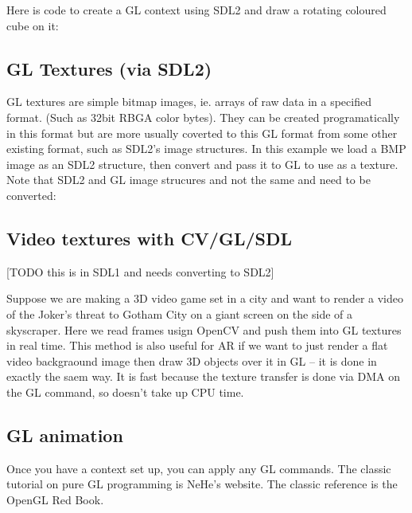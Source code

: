 \documentclass[oneside,english]{scrbook}
\begin{document}



Here is code to create a GL context using SDL2 and draw a rotating coloured cube on it:




\subsection{GL Textures (via SDL2)}

GL textures are simple bitmap images, ie. arrays of raw data in a specified format. (Such as 32bit RBGA color bytes).  They can be created programatically in this format but are more usually coverted to this GL format from some other existing format, such as SDL2's image structures.   In this example we load a BMP image as an SDL2 structure, then convert and pass it to GL to use as a texture. Note that SDL2 and GL image strucures and not the same and need to be converted:




\subsection{Video textures with CV/GL/SDL}

[TODO this is in SDL1 and needs converting to SDL2]

Suppose we are making a 3D video game set in a city and want to render a video of the Joker's threat to Gotham City on a giant screen on the side of a skyscraper.   Here we read frames usign OpenCV and push them into GL textures in real time.   This method is also useful for AR if we want to just render a flat video backgraound image then draw 3D objects over it in GL -- it is done in exactly the saem way.  It is fast because the texture transfer is done via DMA on the GL command, so doesn't take up CPU time.



\subsection{GL animation}

Once you have a context set up, you can apply any GL commands. The classic tutorial on pure GL programming is NeHe's website.  The classic reference is the OpenGL Red Book.
\end{document}
